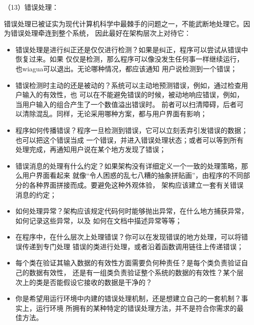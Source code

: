 \documentclass{article}
\begin{document}
\par
（13）错误处理：
\par
错误处理已被证实为现代计算机科学中最棘手的问题之一，不能武断地处理它。因为错误处理牵连到整个系统，
因此最好在架构层次上对待它：
\begin{itemize}
    \item 错误处理是进行纠正还是仅仅进行检测？如果是纠正，程序可以尝试从错误中恢复过来。如果
    仅仅是检测，那么程序可以像没发生任何事一样继续运行，也wiagua可以退出。无论哪种情况，都应该通知
    用户说检测到一个错误；
    \item 错误检测时主动的还是被动的？系统可以主动地预测错误，例如，通过检查用户输入的有效性，也
    可以在不能避免错误的时候，被动地响应错误，例如，当用户输入的组合产生了一个数值溢出错误时。
    前者可以扫清障碍，后者可以清除混乱。同样，无论采用哪种方案，都与用户界面有影响；
    \item 程序如何传播错误？程序一旦检测到错误，它可以立刻丢弃引发错误的数据；也可以把这个错误当成
    一个错误，并进入错误处理状态；或者可以等到所有处理完成，再通知用户说在某个地方发现了错误；
    \item 错误消息的处理有什么约定？如果架构没有详细定义一个一致的处理策略，那么用户界面看起来
    就像“令人困惑的乱七八糟的抽象拼贴画”，由程序的不同部分的各种界面拼接而成。要避免这种外观体验，
    架构应该建立一套有关错误消息的约定；
    \item 如何处理异常？架构应该规定代码何时能够抛出异常，在什么地方捕获异常，如何记录这些异常，以及
    如何在文档中描述异常等等；
    \item 在程序中，在什么层次上处理错误？你可以在发现错误的地方处理，可以将错误传递到专门处理
    错误的类进行处理，或者沿着函数调用链往上传递错误；
    \item 每个类在验证其输入数据的有效性方面需要负何种责任？是每个类负责验证自己的数据有效性，
    还是有一组类负责验证整个系统的数据的有效性？某个层次上的类是否能假设它接收的数据是干净的？
    \item 你是希望用运行环境中内建的错误处理机制，还是想建立自己的一套机制？事实上，运行环境
    所拥有的某种特定的错误处理方法，并不是符合你需求的最佳方法。
\end{itemize}
\end{document}
